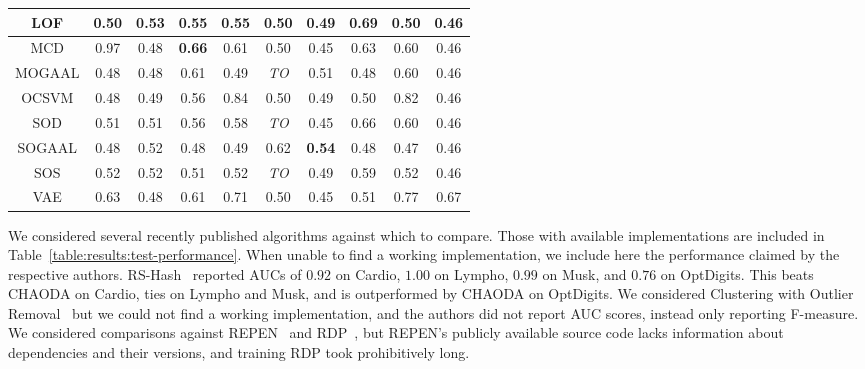 \begin{table*}[!t]
\begin{center}
\begin{small}
\begin{sc}
\begin{tabular}{|c|c|c|c|c|c|c|c|c|c|}
\hline
LOF            &          0.50 &               0.53 &          0.55 &              0.55 &          0.50 &          0.49 &            0.69 &          0.50 &          0.46 \\
\hline
MCD            &          0.97 &               0.48 & \textbf{0.66} &              0.61 &          0.50 &          0.45 &            0.63 &          0.60 &          0.46 \\
\hline
MOGAAL         &          0.48 &               0.48 &          0.61 &              0.49 &   \textit{TO} &          0.51 &            0.48 &          0.60 &          0.46 \\
\hline
OCSVM          &          0.48 &               0.49 &          0.56 &              0.84 &          0.50 &          0.49 &            0.50 &          0.82 &          0.46 \\
\hline
SOD            &          0.51 &               0.51 &          0.56 &              0.58 &   \textit{TO} &          0.45 &            0.66 &          0.60 &          0.46 \\
\hline
SOGAAL         &          0.48 &               0.52 &          0.48 &              0.49 &          0.62 & \textbf{0.54} &            0.48 &          0.47 &          0.46 \\
\hline
SOS            &          0.52 &               0.52 &          0.51 &              0.52 &   \textit{TO} &          0.49 &            0.59 &          0.52 &          0.46 \\
\hline
VAE            &          0.63 &               0.48 &          0.61 &              0.71 &          0.50 &          0.45 &            0.51 &          0.77 &          0.67 \\
\hline
\end{tabular}
\end{sc}
\end{small}
\end{center}
\vskip -0.1in
\end{table*}

We considered several recently published algorithms against which to compare.
Those with available implementations are included in Table~\ref{table:results:test-performance}.
When unable to find a working implementation, we include here the performance claimed by the respective authors.
RS-Hash~\cite{sathe2016subspace} reported AUCs of $0.92$ on Cardio, $1.00$ on Lympho, $0.99$ on Musk, and $0.76$ on OptDigits.
This beats CHAODA on Cardio, ties on Lympho and Musk, and is outperformed by CHAODA on OptDigits.
We considered Clustering with Outlier Removal~\cite{liu2019clustering} but we could not find a working implementation, and the authors did not report AUC scores, instead only reporting F-measure.
We considered comparisons against REPEN~\cite{pang2018learning} and RDP~\cite{wang2019unsupervised}, but REPEN's publicly available source code lacks information about dependencies and their versions, and training RDP took prohibitively long.
